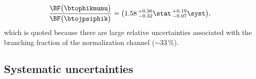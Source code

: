 \begin{equation}
  \frac{ \BF\big(\btophikmumu\big) }{ \BF\big(\btojpsiphik\big) }
  =\big(1.58\,^{+0.36}_{-0.32}\stat\,^{+0.19}_{-0.07}\syst\big),
\end{equation}
which is quoted because there are large relative uncertainties associated with the branching
fraction of the normalization channel ($\sim33\,\%$).







\subsection{Systematic uncertainties}
\label{ssec:phik:syst}
